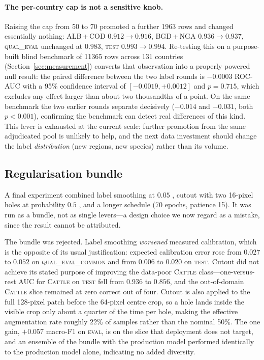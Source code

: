 \documentclass[11pt,a4paper]{article}
\begin{document}
\paragraph{The per-country cap is not a sensitive knob.}
Raising the cap from 50 to 70 promoted a further \num{1963} rows and changed
essentially nothing: ALB\,+\,COD $0.912 \rightarrow 0.916$, BGD\,+\,NGA
$0.936 \rightarrow 0.937$, \textsc{qual\_eval} unchanged at $0.983$,
\textsc{test} $0.993 \rightarrow 0.994$. Re-testing this on a purpose-built blind
benchmark of \num{11365} rows across 131 countries (Section~\ref{sec:measurement})
converts that observation into a properly powered null result: the paired
difference between the two label rounds is $-0.0003$ ROC-AUC with a 95\%
confidence interval of $[-0.0019, +0.0012]$ and $p = 0.715$, which excludes any
effect larger than about two thousandths of a point. On the same benchmark the
two earlier rounds separate decisively ($-0.014$ and $-0.031$, both $p < 0.001$),
confirming the benchmark can detect real differences of this kind. This lever is
exhausted at the current scale: further promotion from the same adjudicated pool
is unlikely to help, and the next data investment should change the label
\emph{distribution} (new regions, new species) rather than its volume.

\subsection{Regularisation bundle}
\label{sec:v10}

A final experiment combined label smoothing at $0.05$
\citep{szegedy2016rethinking}, cutout with two 16-pixel holes at probability
$0.5$ \citep{devries2017cutout}, and a longer schedule (70 epochs, patience 15).
It was run as a bundle, not as single levers---a design choice we now regard as
a mistake, since the result cannot be attributed.

The bundle was rejected. Label smoothing \emph{worsened} measured calibration,
which is the opposite of its usual justification: expected calibration error
\citep{guo2017calibration} rose from $0.027$ to $0.052$ on
\textsc{qual\_eval\_common} and from $0.006$ to $0.020$ on \textsc{test}. Cutout
did not achieve its stated purpose of improving the data-poor \textsc{Cattle}
class---one-versus-rest AUC for \textsc{Cattle} on \textsc{test} fell from
$0.936$ to $0.856$, and the out-of-domain \textsc{Cattle} slice remained at zero
correct out of four. Cutout is also applied to the full 128-pixel patch before
the 64-pixel centre crop, so a hole lands inside the visible crop only about a
quarter of the time per hole, making the effective augmentation rate roughly 22\%
of samples rather than the nominal 50\%. The one gain, $+0.057$ macro-F1 on
\textsc{eval}, is on the slice that deployment does not target, and an ensemble
of the bundle with the production model performed identically to the production
model alone, indicating no added diversity.
\end{document}
